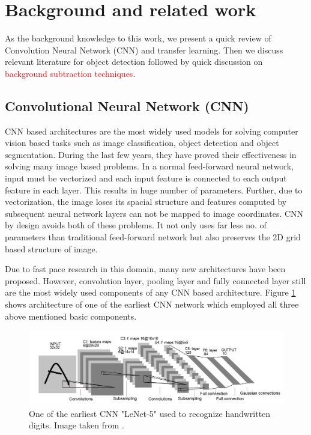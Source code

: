 \section{Background and related work}
As the background knowledge to this work, we present a quick review of Convolution Neural Network (CNN) and transfer learning. Then we discuss relevant literature for object detection followed by quick discussion on \textcolor{red}{background subtraction techniques}. 


\subsection{Convolutional Neural Network (CNN)}
CNN based architectures are the most widely used models for solving computer vision based tasks such as image classification, object detection and object segmentation. During the last few years, they have proved their effectiveness in solving many image based problems. In a normal feed-forward neural network, input must be vectorized and each input feature is connected to each output feature in each layer. This results in huge number of parameters. Further, due to vectorization, the image loses its spacial structure and features computed by subsequent neural network layers can not be mapped to image coordinates. CNN by design avoids both of these problems. It not only uses far less no. of parameters than traditional feed-forward network but also preserves the 2D grid based structure of image\cite{arkar_thesis}.

Due to fast pace research in this domain, many new architectures have been proposed. However, convolution layer, pooling layer and fully connected layer still are the most widely used components of any CNN based architecture. Figure \ref{fig:lenet-5} shows architecture of one of the earliest CNN network which employed all three above mentioned basic components. 

\begin{figure}
    \centering
    \includegraphics[width=\linewidth]{images/lenet-5.PNG}
    \caption[LeNet-5]{One of the earliest CNN "LeNet-5" used to  recognize handwritten
digits. Image taken from \cite{lecun1998gradient}.}
    \label{fig:lenet-5}
\end{figure}


